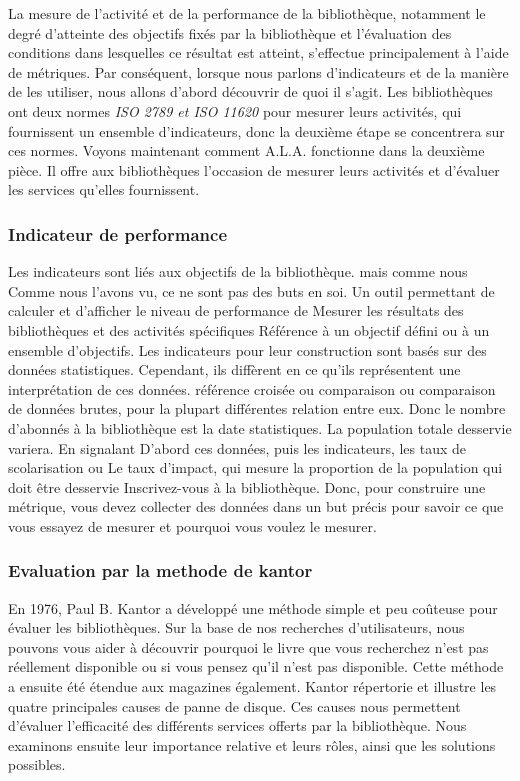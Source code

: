 \documentclass[french,a4paper,12pt]{article}
\begin{document}
\quad  La mesure de l'activité et de la performance de la bibliothèque, notamment le degré d'atteinte des objectifs fixés par la bibliothèque et l'évaluation des conditions dans lesquelles ce résultat est atteint, s'effectue principalement à l'aide de métriques. Par conséquent, lorsque nous parlons d'indicateurs et de la manière de les utiliser, nous allons d'abord découvrir de quoi il s'agit. Les bibliothèques ont deux normes \textit{ISO 2789 et ISO 11620} pour mesurer leurs activités, qui fournissent un ensemble d'indicateurs, donc la deuxième étape se concentrera sur ces normes. Voyons maintenant comment A.L.A. fonctionne dans la deuxième pièce. Il offre aux bibliothèques l'occasion de mesurer leurs activités et d'évaluer les services qu'elles fournissent. 

\subsubsection{Indicateur de performance } \citep{Gouyon}

\quad Les indicateurs sont liés aux objectifs de la bibliothèque. mais comme nous Comme nous l'avons vu, ce ne sont pas des buts en soi. Un outil permettant de calculer et d'afficher le niveau de performance de Mesurer les résultats des bibliothèques et des activités spécifiques Référence à un objectif défini ou à un ensemble d'objectifs. Les indicateurs pour leur construction sont basés sur des données statistiques. Cependant, ils diffèrent en ce qu'ils représentent une interprétation de ces données. 
référence croisée ou comparaison ou comparaison de données brutes, pour la plupart différentes relation entre eux. Donc le nombre d'abonnés à la bibliothèque est la date statistiques. La population totale desservie variera. En signalant D'abord ces données, puis les indicateurs, les taux de scolarisation ou Le taux d'impact, qui mesure la proportion de la population qui doit être desservie 
Inscrivez-vous à la bibliothèque. Donc, pour construire une métrique, vous devez collecter des données dans un but précis pour savoir ce que vous essayez de mesurer et pourquoi vous voulez le mesurer. 
 
 \subsubsection{Evaluation par la methode de kantor}\citep{LapèlerieFrançois1994}

\quad En 1976, Paul B. Kantor a développé une méthode simple et peu coûteuse pour évaluer les bibliothèques. Sur la base de nos recherches d'utilisateurs, nous pouvons vous aider à découvrir pourquoi le livre que vous recherchez n'est pas réellement disponible ou si vous pensez qu'il n'est pas disponible. Cette méthode a ensuite été étendue aux magazines également. Kantor répertorie et illustre les quatre principales causes de panne de disque. Ces causes nous permettent d'évaluer l'efficacité des différents services offerts par la bibliothèque. Nous examinons ensuite leur importance relative et leurs rôles, ainsi que les solutions possibles.
\end{document}

